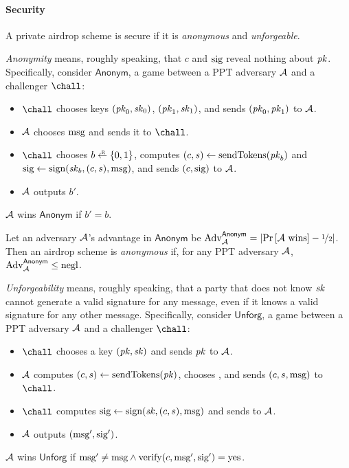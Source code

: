 \paragraph{Security} A private airdrop scheme is secure if it is \emph{anonymous} and \emph{unforgeable}.

\medskip\noindent\textit{Anonymity} means, roughly speaking, that $c$ and $\text{sig}$ reveal
    nothing about $\mathit{pk}$.
Specifically, consider $\mathsf{Anonym}$, a game between a PPT adversary $\mathcal{A}$
    and a challenger $\chall$:
%
\begin{itemize}
\item $\chall$ chooses keys $(\mathit{pk}_0, \mathit{sk}_0)$, $(\mathit{pk}_1, \mathit{sk}_1)$, and sends $(\mathit{pk}_0, \mathit{pk}_1)$ to $\mathcal{A}$.

\item $\mathcal{A}$ chooses $\text{msg}$ and sends it to $\chall$.

\item $\chall$ chooses $b \rgets \{0,1\}$,
computes $(c, s) \gets \text{sendTokens}(\mathit{pk}_b)$ and
$\text{sig} \gets \text{sign}(\mathit{sk}_b, (c, s), \text{msg})$,
and sends $(c, \text{sig})$ to $\mathcal{A}$.

\item $\mathcal{A}$ outputs $b'$.

\end{itemize}
%
$\mathcal{A}$ wins $\mathsf{Anonym}$ if $b' = b$.

\begin{definition}
Let an adversary $\mathcal{A}$'s advantage in $\mathsf{Anonym}$ be
$\mathrm{Adv}_{\mathcal{A}}^{\mathsf{Anonym}} = \left|{\operatorname*{Pr}\left[{\mathcal{A}~\text{wins}}\right] - \nicefrac{1}{2}}\right|$.
Then an airdrop scheme is \emph{anonymous} if, for any PPT adversary
    $\mathcal{A}$, $\mathrm{Adv}_{\mathcal{A}}^{\mathsf{Anonym}} \le \text{negl}$.
\end{definition}


\medskip\noindent\textit{Unforgeability} means, roughly speaking, that
    a party that does not know $\mathit{sk}$ cannot generate a valid signature
    for any message, even if it knows a valid signature for any other
    message.
Specifically, consider $\mathsf{Unforg}$, a game between a PPT adversary
    $\mathcal{A}$ and a challenger $\chall$:
%
\begin{itemize}
\item $\chall$ chooses a key $(\mathit{pk}, \mathit{sk})$ and sends $\mathit{pk}$ to $\mathcal{A}$.

\item $\mathcal{A}$ computes $(c, s) \gets \text{sendTokens}(\mathit{pk})$, chooses \msg, and sends $(c, s, \text{msg})$ to $\chall$.

\item $\chall$ computes $\text{sig} \gets \text{sign}(\mathit{sk}, (c, s), \text{msg})$ and sends to $\mathcal{A}$.

\item $\mathcal{A}$ outputs $(\text{msg}', \text{sig}')$.

\end{itemize}
%
$\mathcal{A}$ wins $\mathsf{Unforg}$ if $\text{msg}' \neq \text{msg} \wedge \text{verify}(c, \text{msg}', \text{sig}') = \text{yes}$.

